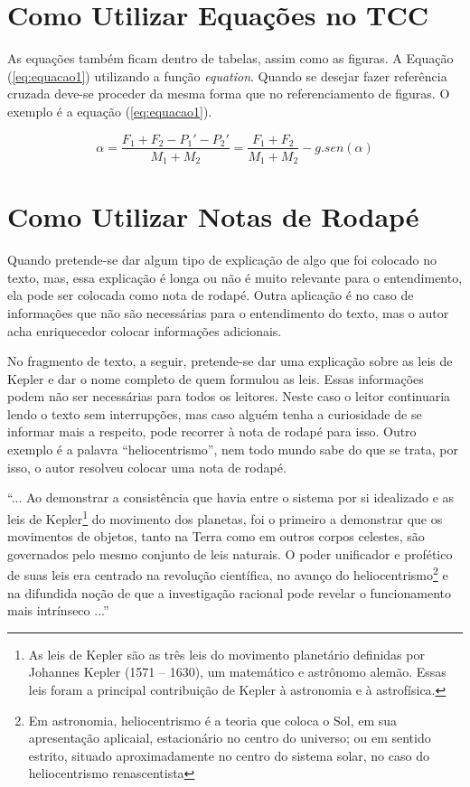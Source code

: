\documentclass[
        oneside,      %
        english,			
        brazil			 
        ]{configcefetmglpd}
\begin{document}
\section{Como Utilizar Equações no TCC}

As equações também ficam dentro de tabelas, assim como as figuras. A Equação (\ref{eq:equacao1}) utilizando a função \textit{equation}.  Quando se desejar fazer referência cruzada deve-se proceder da mesma forma que no referenciamento de figuras. O exemplo é a equação (\ref{eq:equacao1}).

\begin{equation}
	\label{eq:equacao1}
	\alpha = \frac{F_1 + F_2 - P_1' - P_2'}{M_1+M_2} = \frac{F_1 + F_2}{M_1 + M_2}-g.sen(\alpha)
\end{equation}

\section{Como Utilizar Notas de Rodapé}
Quando pretende-se dar algum tipo de explicação de algo que foi colocado no texto, mas, essa explicação é longa ou não é muito relevante para o entendimento, ela pode ser colocada como nota de rodapé. Outra aplicação é no caso de informações que não são necessárias para o entendimento do texto, mas o autor acha enriquecedor colocar informações adicionais.

No fragmento de texto, a seguir, pretende-se dar uma explicação sobre as leis de Kepler e dar o nome completo de quem formulou as leis. Essas informações podem não ser necessárias para todos os leitores. Neste caso o leitor continuaria lendo o texto sem interrupções, mas caso alguém tenha a curiosidade de se informar mais a respeito, pode recorrer à nota de rodapé para isso. Outro exemplo é a palavra “heliocentrismo”, nem todo mundo sabe do que se trata, por isso, o autor resolveu colocar uma nota de rodapé.

“... Ao demonstrar a consistência que havia entre o sistema por si idealizado e as leis de Kepler\footnote{As leis de Kepler são as três leis do movimento planetário definidas por Johannes Kepler (1571 – 1630), um matemático e astrônomo alemão. Essas leis foram a principal contribuição de Kepler à astronomia e à astrofísica.}  do movimento dos planetas, foi o primeiro a demonstrar que os movimentos de objetos, tanto na Terra como em outros corpos celestes, são governados pelo mesmo conjunto de leis naturais. O poder unificador e profético de suas leis era centrado na revolução científica, no avanço do heliocentrismo\footnote{Em astronomia, heliocentrismo é a teoria que coloca o Sol, em sua apresentação aplicaial, estacionário no centro do universo; ou em sentido estrito, situado aproximadamente no centro do sistema solar, no caso do heliocentrismo renascentista}  e na difundida noção de que a investigação racional pode revelar o funcionamento mais intrínseco ...” %
\end{document}
